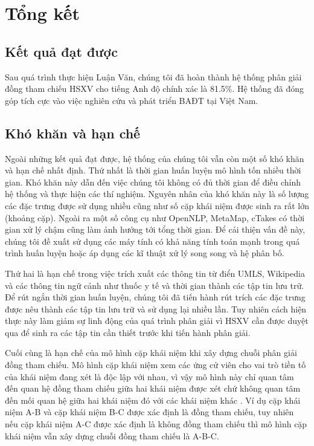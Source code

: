 \chapter{Tổng kết}

\section{Kết quả đạt được}
Sau quá trình thực hiện Luận Văn, chúng tôi đã hoàn thành hệ thống phân giải đồng tham chiếu HSXV cho tiếng Anh độ chính xác là 81.5\%. Hệ thống đã đóng góp tích cực vào việc nghiên cứu và phát triển BAĐT tại Việt Nam.

\section{Khó khăn và hạn chế}
Ngoài những kết quả đạt được, hệ thống của chúng tôi vẫn còn một số khó khăn và hạn chế nhất định. Thứ nhất là thời gian huấn luyện mô hình tốn nhiều thời gian. Khó khăn này dẫn đến việc chúng tôi không có đủ thời gian để điều chỉnh hệ thống và thực hiện các thí nghiệm. Nguyên nhân của khó khăn này là số lượng các đặc trưng được sử dụng nhiều cũng như số cặp khái niệm được sinh ra rất lớn (khoảng cặp). Ngoài ra một số công cụ như OpenNLP, MetaMap, cTakes có thời gian xử lý chậm cũng làm ảnh hưởng tới tổng thời gian. Để cải thiện vấn đề này, chúng tôi đề xuất sử dụng các máy tính có khả năng tính toán mạnh trong quá trình huấn luyện hoặc áp dụng các kĩ thuật xử lý song song và hệ phân bố.

Thứ hai là hạn chế trong việc trích xuất các thông tin từ điển UMLS, Wikipedia và các thông tin ngữ cảnh như thuốc y tế và thời gian thành các tập tin lưu trữ. Để rút ngắn thời gian huấn luyện, chúng tôi đã tiến hành rút trích các đặc trưng được nêu thành các tập tin lưu trữ và sử dụng lại nhiều lần. Tuy nhiên cách hiện thực này làm giảm sự linh động của quá trình phân giải vì HSXV cần được duyệt qua để sinh ra các tập tin cần thiết trước khi tiến hành phân giải.

Cuối cùng là hạn chế của mô hình cặp khái niệm khi xây dựng chuỗi phân giải đồng tham chiếu. Mô hình cặp khái niệm xem các ứng cử viên cho vai trò tiền tố của khái niệm đang xét là độc lập với nhau, vì vậy mô hình này chỉ quan tâm đến quan hệ đồng tham chiếu giữa hai khái niệm được xét chứ không quan tâm đến mối quan hệ giữa hai khái niệm đó với các khái niệm khác \cite{VincentNg2010}. Ví dụ cặp khái niệm A-B và cặp khái niệm B-C được xác định là đồng tham chiếu, tuy nhiên nếu cặp khái niệm A-C được xác định là không đồng tham chiếu thì mô hình cặp khái niệm vẫn xây dựng chuỗi đồng tham chiếu là A-B-C.

